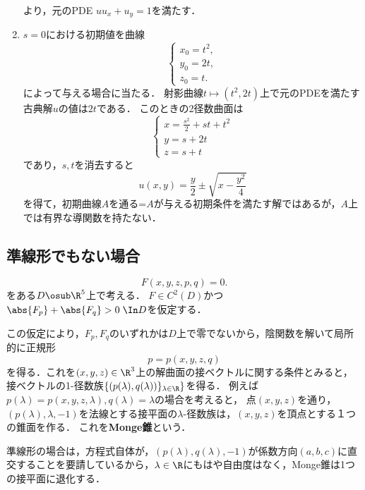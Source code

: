 \documentclass[uplatex,dvipdfmx]{jsreport}
\begin{document}
\begin{example}[非斉次Burgers方程式]
\begin{enumerate}
        より，元のPDE $uu_x+u_y=1$を満たす．
        \item $s=0$における初期値を曲線
        \[\begin{cases}
            x_0=t^2,\\
            y_0=2t,\\
            z_0=t.
        \end{cases}\]
        によって与える場合に当たる．
        射影曲線$t\mapsto(t^2,2t)$上で元のPDEを満たす古典解$u$の値は$2t$である．
        このときの2径数曲面は
        \[\begin{cases}
            x=\frac{s^2}{2}+st+t^2\\
            y=s+2t\\
            z=s+t
        \end{cases}\]
        であり，$s,t$を消去すると
        \[u(x,y)=\frac{y}{2}\pm\sqrt{x-\frac{y^2}{4}}\]
        を得て，初期曲線$A$を通る=$A$が与える初期条件を満たす解ではあるが，$A$上では有界な導関数を持たない．
    \end{enumerate}
\end{example}

\subsection{準線形でもない場合}

\begin{problem}
    \[F(x,y,z,p,q)=0.\]
    をある$D\osub\R^5$上で考える．
    $F\in C^2(D)$かつ$\abs{F_p}+\abs{F_q}>0\;\In D$を仮定する．
\end{problem}
\begin{observation}
    この仮定により，$F_p,F_q$のいずれかは$D$上で零でないから，陰関数を解いて局所的に正規形
    \[p=p(x,y,z,q)\]
    を得る．これを$(x,y,z)\in\R^3$上の解曲面の接ベクトルに関する条件とみると，接ベクトルの1-径数族$\{(p(\lambda),q(\lambda))\}_{\lambda\in\R}\}$を得る．
    例えば$p(\lambda)=p(x,y,z,\lambda),q(\lambda)=\lambda$の場合を考えると，
    点$(x,y,z)$を通り，$(p(\lambda),\lambda,-1)$を法線とする接平面の$\lambda$-径数族は，$(x,y,z)$を頂点とする１つの錐面を作る．
    これを\textbf{Monge錐}という．
\end{observation}
\begin{remarks}
    準線形の場合は，方程式自体が，$(p(\lambda),q(\lambda),-1)$が係数方向$(a,b,c)$に直交することを要請しているから，$\lambda\in\R$にもはや自由度はなく，Monge錐は1つの接平面に退化する．
\end{remarks}
\end{document}
